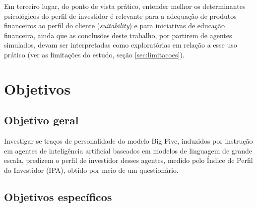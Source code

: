 Em terceiro lugar, do ponto de vista prático, entender melhor os
determinantes psicológicos do perfil de investidor é relevante para a
adequação de produtos financeiros ao perfil do cliente (\textit{suitability})
e para iniciativas de educação financeira, ainda que as conclusões deste
trabalho, por partirem de agentes simulados, devam ser interpretadas como
exploratórias em relação a esse uso prático (ver as limitações do
estudo, seção \ref{sec:limitacoes}).

\section{Objetivos}

\subsection{Objetivo geral}

Investigar se traços de personalidade do modelo Big Five, induzidos por
instrução em agentes de inteligência artificial baseados em modelos de
linguagem de grande escala, predizem o perfil de investidor desses
agentes, medido pelo Índice de Perfil do Investidor (IPA), obtido por
meio de um questionário.

\subsection{Objetivos específicos}

